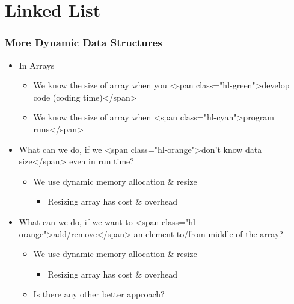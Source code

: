 \documentclass{../c-lecture}
\begin{document}
\section{Linked List}

\begin{frame}
  \frametitle{More Dynamic Data Structures}
  \begin{itemize}
    \item In Arrays
    \begin{itemize}
      \item
        We know the size of array when you
        <span class="hl-green">develop code (coding time)</span>

      \item
        We know the size of array when
        <span class="hl-cyan">program runs</span>

    \end{itemize}
    \item
      What can we do, if we
      <span class="hl-orange">don’t know data size</span> even in run time?

    \begin{itemize}
      \item We use dynamic memory allocation \& resize
      \begin{itemize}
        \item Resizing array has cost \& overhead
      \end{itemize}
    \end{itemize}
  \end{itemize}
\end{frame}
\begin{frame}
  \begin{itemize}
    \item
      What can we do, if we want to
      <span class="hl-orange">add/remove</span> an element to/from middle of
      the array?

    \begin{itemize}
      \item We use dynamic memory allocation \& resize
      \begin{itemize}
        \item Resizing array has cost \& overhead
      \end{itemize}
      \item Is there any other better approach?
    \end{itemize}
  \end{itemize}
\end{frame}
\end{document}
